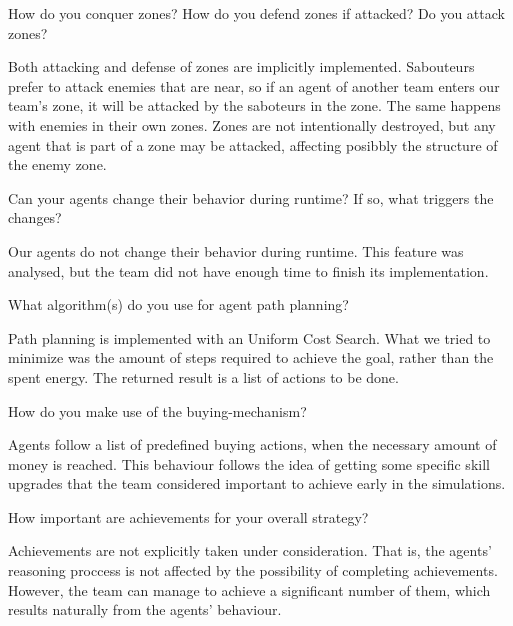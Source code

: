 \begin{question}
How do you conquer zones? How do you defend zones if attacked? Do you
attack zones?  
\end{question}

Both attacking and defense of zones are implicitly implemented. 
Sabouteurs prefer to attack enemies that are near, so if an agent of another 
team enters our team's zone, it will be attacked by the saboteurs in the zone.
The same happens with enemies in their own zones. Zones are not intentionally 
destroyed, but any agent that is part of a zone may be attacked, affecting 
posibbly the structure of the enemy zone.

\begin{question}
Can your agents change their behavior during runtime? If so, what triggers
the changes?  
\end{question}

Our agents do not change their behavior during runtime. This feature was 
analysed, but the team did not have enough time to finish its implementation.

\begin{question}
What algorithm(s) do you use for agent path planning?  
\end{question}

Path planning is implemented with an Uniform Cost Search. What we tried to 
minimize was the amount of steps required to achieve the goal, rather than 
the spent energy. The returned result is a list of actions to be done.

\begin{question}
How do you make use of the buying-mechanism?  
\end{question}

Agents follow a list of predefined buying actions, when the necessary amount 
of money is reached. This behaviour follows the idea of getting some specific skill 
upgrades that the team considered important to achieve early in the simulations.

\begin{question}
How important are achievements for your overall strategy?  
\end{question}

Achievements are not explicitly taken under consideration. That is, the agents'
reasoning proccess is not affected by the possibility of completing achievements.    
However, the team can manage to achieve a significant number of them, which 
results naturally from the agents' behaviour. 

